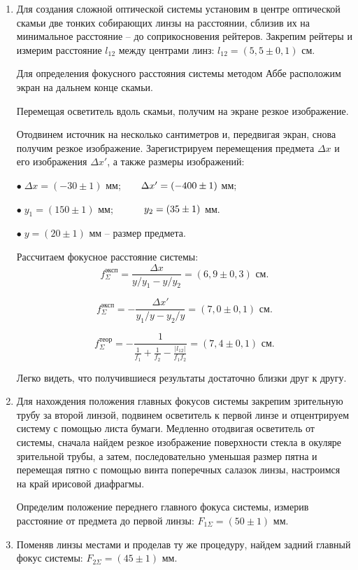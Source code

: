 \documentclass[a4paper,12pt]{article} %
\begin{document}
	\begin{enumerate}
		\item Для создания сложной оптической системы установим в центре оптической скамьи две тонких собирающих линзы на расстоянии, сблизив их на минимальное расстояние -- до соприкосновения рейтеров. Закрепим рейтеры и измерим расстояние $l_{12}$ между центрами линз: $l_{12} = (5,5 \pm 0,1)$ см.
		
		Для определения фокусного расстояния системы методом Аббе расположим экран на дальнем конце скамьи.
		
		Перемещая осветитель вдоль скамьи, получим на экране резкое изображение. 
		
		Отодвинем источник на несколько сантиметров и, передвигая экран, снова получим резкое изображение. Зарегистрируем перемещения предмета $\Delta x$ и его изображения $\Delta x'$, а также размеры изображений:
		
		$\bullet \;\Delta x = (-30 \pm 1)$ мм; $\hspace{6mm} \Delta x' = (-400 \pm 1)$ мм;
		
		$\bullet \;y_1 = (150 \pm 1)$ мм;  $\hspace{10mm} y_2 = (35 \pm 1)$ мм.
		
		$\bullet \;y = (20 \pm 1)$ мм -- размер предмета.
		
		Рассчитаем фокусное расстояние системы:
		\begin{equation*}
			f_\Sigma^\text{эксп} = \frac{\Delta x}{y/y_1 - y/y_2} = (6,9 \pm 0,3) \text{ см}.
		\end{equation*}
	
		\begin{equation*}
			f_\Sigma^\text{эксп} = -\frac{\Delta x'}{y_1/y - y_2/y} = (7,0 \pm 0,1) \text{ см}.
		\end{equation*}
	
		\begin{equation*}
			f_\Sigma^\text{теор} = -\frac{1}{\frac{1}{f_1} + \frac{1}{f_2} - \frac{|l_{12}|}{f_1f_2}} = (7,4 \pm 0,1) \text{ см}.
		\end{equation*}
		
		Легко видеть, что получившиеся результаты достаточно близки друг к другу.
		
		\item Для нахождения положения главных фокусов системы закрепим зрительную трубу за второй линзой, подвинем осветитель к первой линзе и отцентрируем систему с помощью листа бумаги. Медленно отодвигая осветитель от системы, сначала найдем резкое изображение поверхности стекла в окуляре зрительной трубы, а затем, последовательно уменьшая размер пятна и перемещая пятно с помощью винта поперечных салазок линзы, настроимся на край ирисовой диафрагмы.
		
		Определим положение переднего главного фокуса системы, измерив расстояние от предмета до первой линзы: $F_{1\Sigma} = (50 \pm 1)$ мм.
		
		\item Поменяв линзы местами и проделав ту же процедуру, найдем задний главный фокус системы: $F_{2\Sigma} = (45 \pm 1)$ мм.
	\end{enumerate}
\end{document}
